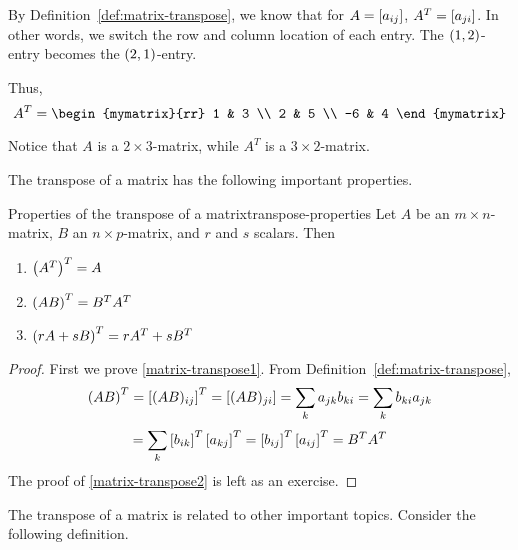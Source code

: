 \begin{solution}
  By Definition~\ref{def:matrix-transpose}, we know that for
  $A = \left[a_{ij} \right]$, $A^T = \left[a_{ji} \right]$. In other words, we
  switch the row and column location of each entry. The
  $\left(1, 2 \right)$-entry becomes the $\left(2,1 \right)$-entry.

  Thus, 
  \begin{equation*}
    A^T = 
    \begin{mymatrix}{rr}
      1 & 3 \\
      2 & 5 \\
      -6 & 4
    \end{mymatrix} 
  \end{equation*}

  Notice that $A$ is a $2 \times 3$-matrix, while $A^T$ is a
  $3 \times 2$-matrix.
\end{solution}

The transpose of a matrix has the following important
properties.

\begin{lemma}{Properties of the transpose of a matrix}{transpose-properties}
  Let $A$ be an $m\times n$-matrix, $B$ an $n\times p$-matrix, and $r$
  and $s$ scalars. Then
  \begin{enumerate}
  \item
    $\left(A^{T}\right)^{T} = A$
  \item
    $\left(AB\right) ^{T}=B^{T}A^{T} $ \label{matrix-transpose1}
  \item
    $\left(rA+ sB\right) ^{T}=rA^{T}+ sB^{T}$  \label{matrix-transpose2}
  \end{enumerate}
\end{lemma}

\begin{proof}
  First we prove \eqref{matrix-transpose1}. From Definition~\ref{def:matrix-transpose},
  \begin{equation*}
    \left(AB\right)^{T} = \left[(AB) _{ij} \right] ^{T}=\left[(AB)_{ji} \right]=\sum_{k}a_{jk}b_{ki}= \sum_{k}b_{ki}a_{jk} 
  \end{equation*}
  \begin{equation*}
    = \sum_{k}\left[b_{ik}\right]^{T}\left[
      a_{kj}\right]^{T}=\left[b_{ij}\right] ^{T} \left[a_{ij}\right]^{T} = B^{T}A^{T} 
  \end{equation*}
  The proof of \eqref{matrix-transpose2} is left as an exercise.
\end{proof}

The transpose of a matrix is related to other important
topics. Consider the following definition.

